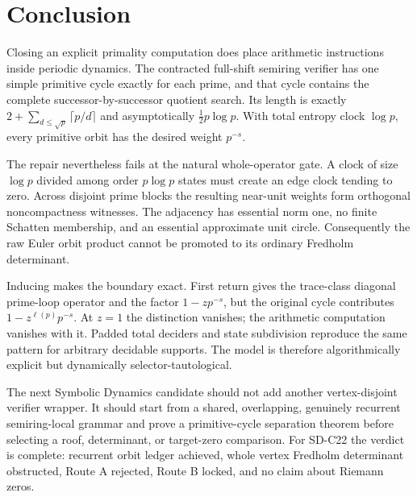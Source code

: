 \section{Conclusion}
\label{sec:conclusion}

Closing an explicit primality computation does place arithmetic instructions
inside periodic dynamics.  The contracted full-shift semiring verifier has
one simple primitive cycle exactly for each prime, and that cycle contains the
complete successor-by-successor quotient search.  Its length is exactly
$2+\sum_{d\le\sqrt p}\lceil p/d\rceil$ and asymptotically
$\frac12p\log p$.  With total entropy clock $\log p$, every primitive orbit
has the desired weight $p^{-s}$.

The repair nevertheless fails at the natural whole-operator gate.  A clock
of size $\log p$ divided among order $p\log p$ states must create an edge
clock tending to zero.  Across disjoint prime blocks the resulting near-unit
weights form orthogonal noncompactness witnesses.  The adjacency has
essential norm one, no finite Schatten membership, and an essential
approximate unit circle.  Consequently the raw Euler orbit product cannot be
promoted to its ordinary Fredholm determinant.

Inducing makes the boundary exact.  First return gives the trace-class
diagonal prime-loop operator and the factor $1-zp^{-s}$, but the original
cycle contributes $1-z^{\ell(p)}p^{-s}$.  At $z=1$ the distinction vanishes;
the arithmetic computation vanishes with it.  Padded total deciders and state
subdivision reproduce the same pattern for arbitrary decidable supports.
The model is therefore algorithmically explicit but dynamically
selector-tautological.

The next Symbolic Dynamics candidate should not add another vertex-disjoint
verifier wrapper.  It should start from a shared, overlapping, genuinely
recurrent semiring-local grammar and prove a primitive-cycle separation
theorem before selecting a roof, determinant, or target-zero comparison.  For
SD-C22 the verdict is complete: recurrent orbit ledger achieved, whole
vertex Fredholm determinant obstructed, Route A rejected, Route B locked, and
no claim about Riemann zeros.
